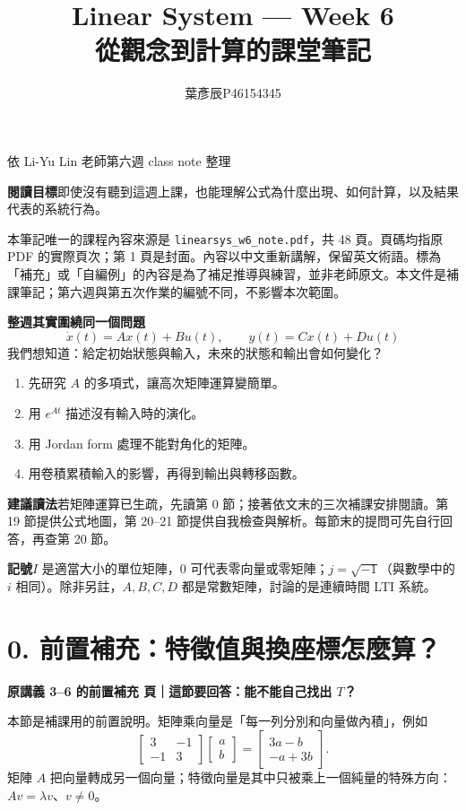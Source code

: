 \documentclass[12pt,a4paper]{article}
\title{Linear System --- Week 6\\[0.4em]\large 從觀念到計算的課堂筆記}
\author{葉彥辰\quad P46154345}
\date{}
\newcommand{\topic}[3]{\clearpage\section*{#1}\textcolor{accent}{\textbf{原講義 #2 頁｜這節要回答：#3}}\par}
\begin{document}
\maketitle
\begin{center}\textcolor{accent}{依 Li-Yu Lin 老師第六週 class note 整理}\end{center}
\textbf{閱讀目標}\quad 即使沒有聽到這週上課，也能理解公式為什麼出現、如何計算，以及結果代表的系統行為。

本筆記唯一的課程內容來源是 \texttt{linearsys\_w6\_note.pdf}，共 48 頁。頁碼均指原 PDF 的實際頁次；第 1 頁是封面。內容以中文重新講解，保留英文術語。標為「補充」或「自編例」的內容是為了補足推導與練習，並非老師原文。本文件是補課筆記；第六週與第五次作業的編號不同，不影響本次範圍。

\textbf{整週其實圍繞同一個問題}
\[
\boxed{\dot x(t)=Ax(t)+Bu(t),\qquad y(t)=Cx(t)+Du(t)}
\]
我們想知道：給定初始狀態與輸入，未來的狀態和輸出會如何變化？
\begin{enumerate}
\item 先研究 $A$ 的多項式，讓高次矩陣運算變簡單。
\item 用 $e^{At}$ 描述沒有輸入時的演化。
\item 用 Jordan form 處理不能對角化的矩陣。
\item 用卷積累積輸入的影響，再得到輸出與轉移函數。
\end{enumerate}
\textbf{建議讀法}\quad 若矩陣運算已生疏，先讀第 0 節；接著依文末的三次補課安排閱讀。第 19 節提供公式地圖，第 20--21 節提供自我檢查與解析。每節末的提問可先自行回答，再查第 20 節。

\textbf{記號}\quad $I$ 是適當大小的單位矩陣，$0$ 可代表零向量或零矩陣；$j=\sqrt{-1}$（與數學中的 $i$ 相同）。除非另註，$A,B,C,D$ 都是常數矩陣，討論的是連續時間 LTI 系統。

\topic{0. 前置補充：特徵值與換座標怎麼算？}{3--6 的前置補充}{能不能自己找出 $T$？}
本節是補課用的前置說明。矩陣乘向量是「每一列分別和向量做內積」，例如
\[
 \begin{bmatrix}3&-1\\-1&3\end{bmatrix}\begin{bmatrix}a\\b\end{bmatrix}
 =\begin{bmatrix}3a-b\\-a+3b\end{bmatrix}.
\]
矩陣 $A$ 把向量轉成另一個向量；特徵向量是其中只被乘上一個純量的特殊方向：$Av=\lambda v$、$v\ne0$。
\end{document}
